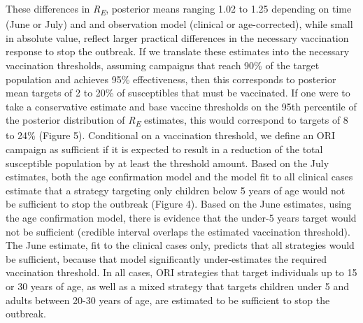 These differences in \emph{R\textsubscript{E}}, posterior means ranging
1.02 to 1.25 depending on time (June or July) and and observation model
(clinical or age-corrected), while small in absolute value, reflect
larger practical differences in the necessary vaccination response to
stop the outbreak. If we translate these estimates into the necessary
vaccination thresholds, assuming campaigns that reach 90\% of the target
population and achieves 95\% effectiveness, then this corresponds to
posterior mean targets of 2 to 20\% of susceptibles that must be
vaccinated. If one were to take a conservative estimate and base vaccine
thresholds on the 95th percentile of the posterior distribution of
\emph{R\textsubscript{E}} estimates, this would correspond to targets of
8 to 24\% (Figure 5). Conditional on a vaccination threshold, we define an
ORI campaign as sufficient if it is expected to result in a reduction of
the total susceptible population by at least the threshold amount. Based
on the July estimates, both the age confirmation model and the model fit
to all clinical cases estimate that a strategy targeting only children
below 5 years of age would not be sufficient to stop the outbreak
(Figure 4). Based on the June estimates, using the age confirmation
model, there is evidence that the under-5 years target would not be
sufficient (credible interval overlaps the estimated vaccination
threshold). The June estimate, fit to the clinical cases only, predicts
that all strategies would be sufficient, because that model
significantly under-estimates the required vaccination threshold. In all
cases, ORI strategies that target individuals up to 15 or 30 years of
age, as well as a mixed strategy that targets children under 5 and
adults between 20-30 years of age, are estimated to be sufficient to
stop the outbreak.